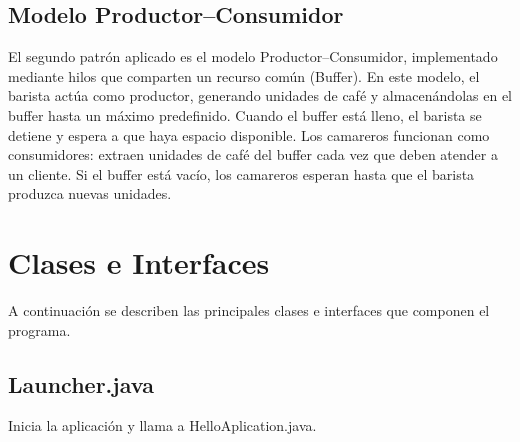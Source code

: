 \documentclass[a4paper,12pt]{article}
\begin{document}
    \subsection{Modelo Productor–Consumidor}
    El segundo patrón aplicado es el modelo Productor–Consumidor, implementado mediante hilos que comparten un recurso común (Buffer).  
    En este modelo, el barista actúa como productor, generando unidades de café y almacenándolas en el buffer hasta un máximo predefinido. Cuando el buffer está lleno, el barista se detiene y espera a que haya espacio disponible.  
    Los camareros funcionan como consumidores: extraen unidades de café del buffer cada vez que deben atender a un cliente. Si el buffer está vacío, los camareros esperan hasta que el barista produzca nuevas unidades.  

    \section{Clases e Interfaces}
    A continuación se describen las principales clases e interfaces que componen el programa. 
        \subsection{Launcher.java}
        Inicia la aplicación y llama a HelloAplication.java.
\end{document}
